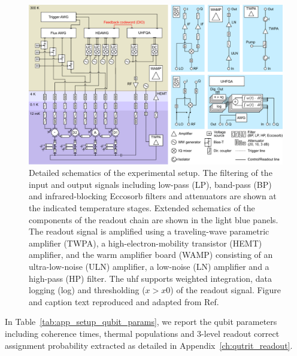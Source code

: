 \begin{figure}[htp]
  \centering
 \includegraphics[width=\textwidth]{appendices/setup/figs/setup.pdf}
 \caption{Detailed schematics of the experimental setup. The filtering of the input and output signals including low-pass (LP), band-pass (BP) and infrared-blocking Eccosorb filters and attenuators are shown at the indicated temperature stages.
Extended schematics of the components of the readout chain are shown in the light blue panels. The readout signal is amplified using a traveling-wave parametric amplifier (TWPA), a high-electron-mobility transistor (HEMT) amplifier, and the warm amplifier board (WAMP) consisting of an ultra-low-noise (ULN) amplifier, a low-noise (LN) amplifier and a high-pass (HP) filter. The \gls{uhf} supports weighted integration, data logging (log) and thresholding ($x > x0$) of the readout signal. Figure and caption text reproduced and adapted from Ref.~\cite{Andersen2019}}
 \label{fig:experimental_setup}
\end{figure}

In Table~\ref{tab:app_setup_qubit_params}, we report the qubit parameters including coherence times, thermal populations and 3-level readout correct assignment probability extracted as detailed in Appendix~\ref{ch:qutrit_readout}.

